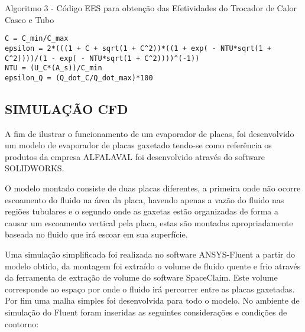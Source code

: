 \documentclass[a4paper,12pt,oneside]{article}
\begin{document}
\begin{flushright}

\lstset{style=mystyle}
\begin{center}
	\normalsize{Algoritmo 3 - Código EES para obtenção das Efetividades do Trocador de Calor Casco e Tubo}
\end{center}
\vspace{0.5cm}
\begin{lstlisting}
C = C_min/C_max
epsilon = 2*(((1 + C + sqrt(1 + C^2))*((1 + exp( - NTU*sqrt(1 + C^2))))/(1 - exp( - NTU*sqrt(1 + C^2))))^(-1))
NTU = (U_C*(A_s))/C_min
epsilon_Q = (Q_dot_C/Q_dot_max)*100
\end{lstlisting}
\vspace{0.5cm}

\pagebreak
\clearpage
\newpage
\subsection{\large SIMULAÇÃO CFD}
\vspace{0.5cm}
 A fim de ilustrar o funcionamento de um evaporador de placas, foi desenvolvido um modelo de evaporador de placas gaxetado tendo-se como referência os produtos da empresa ALFALAVAL foi desenvolvido através do software SOLIDWORKS. 
 
 O modelo montado consiste de duas placas diferentes, a primeira onde não ocorre escoamento do fluido na área da placa, havendo apenas a vazão do fluido nas regiões tubulares e o segundo onde as gaxetas estão organizadas de forma a causar um escoamento vertical pela placa, estas são montadas apropriadamente baseada no fluido que irá escoar em sua superfície.
 
 
Uma simulação simplificada foi realizada no software ANSYS-Fluent a partir do modelo obtido, da montagem foi extraído o volume de fluido quente e frio através da ferramenta de extração de volume do software SpaceClaim. Este volume corresponde ao espaço por onde o fluido irá percorrer entre as placas gaxetadas. Por fim uma malha simples foi desenvolvida para todo o modelo. No ambiente de simulação do Fluent foram inseridas as seguintes considerações e condições de contorno:


\end{flushright}
\end{document}
